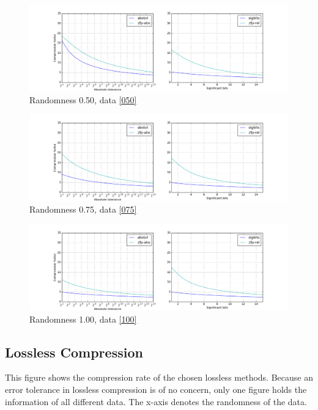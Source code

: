 \documentclass[
	12pt,
	a4paper,
	BCOR10mm,
	DIV14,
	headsepline,
]{scrreprt}
\begin{document}
\begin{figure}[H]
	\centering
	\includegraphics[width=\textwidth]{050_lossy_rates.png}
	\caption{Randomness 0.50, data \ref{050}}
	\label{fig:050_rate}
\end{figure}

\begin{figure}[H]
	\centering
	\includegraphics[width=\textwidth]{075_lossy_rates.png}
	\caption{Randomness 0.75, data \ref{075}}
	\label{fig:075_rate}
\end{figure}

\begin{figure}[H]
	\centering
	\includegraphics[width=\textwidth]{100_lossy_rates.png}
	\caption{Randomness 1.00, data \ref{100}}
	\label{fig:100_rate}
\end{figure}

\clearpage

\subsection{Lossless Compression}

\bigskip

This figure shows the compression rate of the chosen lossless methods.
Because an error tolerance in lossless compression is of no concern, only one
figure holds the information of all different data. The x-axis denotes the
randomness of the data.
\end{document}
